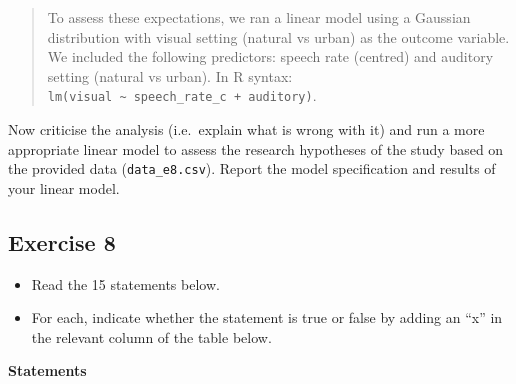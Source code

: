 \documentclass[
]{article}
\providecommand{\tightlist}{%
  \setlength{\itemsep}{0pt}\setlength{\parskip}{0pt}}
\begin{document}
\begin{quote}
To assess these expectations, we ran a linear model using a Gaussian
distribution with visual setting (natural vs urban) as the outcome
variable. We included the following predictors: speech rate (centred)
and auditory setting (natural vs urban). In R syntax:
\texttt{lm(visual\ \textasciitilde{}\ speech\_rate\_c\ +\ auditory)}.
\end{quote}

Now criticise the analysis (i.e.~explain what is wrong with it) and run
a more appropriate linear model to assess the research hypotheses of the
study based on the provided data (\texttt{data\_e8.csv}). Report the
model specification and results of your linear model.

\hypertarget{exercise-8}{%
\subsection{Exercise 8}\label{exercise-8}}

\begin{itemize}
\tightlist
\item
  Read the 15 statements below.
\item
  For each, indicate whether the statement is true or false by adding an
  ``x'' in the relevant column of the table below.
\end{itemize}

\textbf{Statements}
\end{document}
